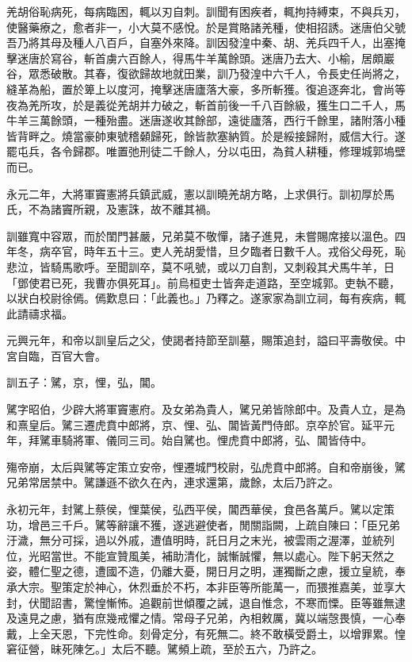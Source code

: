 \begin{pinyinscope}
羌胡俗恥病死，每病臨困，輒以刃自刺。訓聞有困疾者，輒拘持縛束，不與兵刃，使醫藥療之，愈者非一，小大莫不感悅。於是賞賂諸羌種，使相招誘。迷唐伯父號吾乃將其母及種人八百戶，自塞外來降。訓因發湟中秦、胡、羌兵四千人，出塞掩擊迷唐於寫谷，斬首虜六百餘人，得馬牛羊萬餘頭。迷唐乃去大、小榆，居頗巖谷，眾悉破散。其春，復欲歸故地就田業，訓乃發湟中六千人，令長史任尚將之，縫革為船，置於箄上以度河，掩擊迷唐廬落大豪，多所斬獲。復追逐奔北，會尚等夜為羌所攻，於是義從羌胡并力破之，斬首前後一千八百餘級，獲生口二千人，馬牛羊三萬餘頭，一種殆盡。迷唐遂收其餘部，遠徙廬落，西行千餘里，諸附落小種皆背畔之。燒當豪帥東號稽顙歸死，餘皆款塞納質。於是綏接歸附，威信大行。遂罷屯兵，各令歸郡。唯置弛刑徒二千餘人，分以屯田，為貧人耕種，修理城郭塢壁而已。

永元二年，大將軍竇憲將兵鎮武威，憲以訓曉羌胡方略，上求俱行。訓初厚於馬氏，不為諸竇所親，及憲誅，故不離其禍。

訓雖寬中容眾，而於閨門甚嚴，兄弟莫不敬憚，諸子進見，未嘗賜席接以溫色。四年冬，病卒官，時年五十三。吏人羌胡愛惜，旦夕臨者日數千人。戎俗父母死，恥悲泣，皆騎馬歌呼。至聞訓卒，莫不吼號，或以刀自割，又刺殺其犬馬牛羊，日「鄧使君已死，我曹亦俱死耳」。前烏桓吏士皆奔走道路，至空城郭。吏執不聽，以狀白校尉徐傿。傿歎息曰：「此義也。」乃釋之。遂家家為訓立祠，每有疾病，輒此請禱求福。

元興元年，和帝以訓皇后之父，使謁者持節至訓墓，賜策追封，謚曰平壽敬侯。中宮自臨，百官大會。

訓五子：騭，京，悝，弘，閶。

騭字昭伯，少辟大將軍竇憲府。及女弟為貴人，騭兄弟皆除郎中。及貴人立，是為和熹皇后。騭三遷虎賁中郎將，京、悝、弘、閶皆黃門侍郎。京卒於官。延平元年，拜騭車騎將軍、儀同三司。始自騭也。悝虎賁中郎將，弘、閶皆侍中。

殤帝崩，太后與騭等定策立安帝，悝遷城門校尉，弘虎賁中郎將。自和帝崩後，騭兄弟常居禁中。騭謙遜不欲久在內，連求還第，歲餘，太后乃許之。

永初元年，封騭上蔡侯，悝葉侯，弘西平侯，閶西華侯，食邑各萬戶。騭以定策功，增邑三千戶。騭等辭讓不獲，遂逃避使者，閒關詣闕，上疏自陳曰：「臣兄弟汙濊，無分可採，過以外戚，遭值明時，託日月之末光，被雲雨之渥澤，並統列位，光昭當世。不能宣贊風美，補助清化，誠慚誠懼，無以處心。陛下躬天然之姿，體仁聖之德，遭國不造，仍離大憂，開日月之明，運獨斷之慮，援立皇統，奉承大宗。聖策定於神心，休烈垂於不朽，本非臣等所能萬一，而猥推嘉美，並享大封，伏聞詔書，驚惶慚怖。追觀前世傾覆之誡，退自惟念，不寒而慄。臣等雖無逮及遠見之慮，猶有庶幾戒懼之情。常母子兄弟，內相敕厲，冀以端愨畏慎，一心奉戴，上全天恩，下完性命。刻骨定分，有死無二。終不敢橫受爵土，以增罪累。惶窘征營，昧死陳乞。」太后不聽。騭頻上疏，至於五六，乃許之。


\end{pinyinscope}

